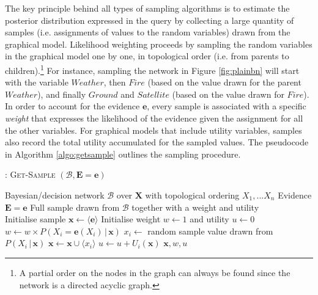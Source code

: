 The key principle behind all types of sampling algorithms is to estimate the posterior distribution expressed in the query by collecting a large quantity of samples (i.e. assignments of values to the random variables) drawn from the graphical model.  Likelihood weighting proceeds by sampling the random variables in the graphical model one by one, in topological order (i.e. from parents to children).\footnote{A partial order on the nodes in the graph can always be found since the network is a directed acyclic graph.} For instance, sampling the network in Figure \ref{fig:plainbn} will start with the variable $\mathit{Weather}$, then $\mathit{Fire}$ (based on the value drawn for the parent $\mathit{Weather}$), and finally $\mathit{Ground}$ and $\mathit{Satellite}$ (based on the value drawn for $\mathit{Fire}$).  In order to account for the evidence $\mathbf{e}$, every sample is associated with a specific \textit{weight} that expresses the likelihood of the evidence given the assignment for all the other variables.  For graphical models that include utility variables, samples also record the total utility accumulated for the sampled values. The pseudocode in Algorithm \ref{algo:getsample} outlines the sampling procedure.  
\begin{algorithm}[h]
\begin{algorithmic} \vspace{2mm} 
\caption{: \textsc{Get-Sample} $(\mathcal{B},\mathbf{E}=\mathbf{e})$}
\REQUIRE Bayesian/decision network $\mathcal{B}$ over $\mathbf{X}$ with topological ordering $X_1,...X_n$
\REQUIRE Evidence $\mathbf{E} =\mathbf{e}$
\ENSURE Full sample drawn from $\mathcal{B}$ together with a weight and utility \\[2mm]
\STATE Initialise sample $\mathbf{x} \leftarrow \langle \mathbf{e} \rangle$
\STATE Initialise weight $w \leftarrow 1$ and utility $u \leftarrow 0$
\STATE $w \leftarrow w \times P\left(X_i = \mathbf{e}(X_i)  \, | \,  \mathbf{x}\right)$
\STATE $x_i \leftarrow$ random sample value drawn from $P(X_i  \, | \,  \mathbf{x})$
\STATE $\mathbf{x} \leftarrow \mathbf{x} \cup \langle x_i \rangle$
\STATE $u \leftarrow u + U_i(\mathbf{x})$
\ENDIF
\ENDFOR
\RETURN $\mathbf{x}, w, u$
\end{algorithmic}
\label{algo:getsample}
\end{algorithm}

